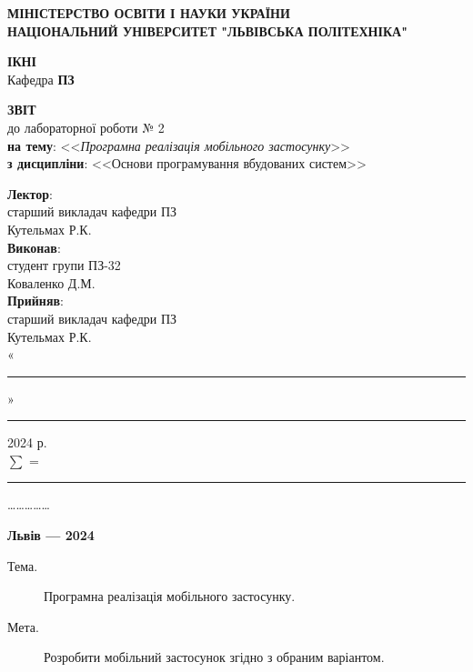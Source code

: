 \documentclass[oneside,14pt]{extarticle}
\newcommand\subject{Основи програмування вбудованих систем}
\newcommand\lecturer{старший викладач кафедри ПЗ\\Кутельмах Р.К.}
\newcommand\teacher{старший викладач кафедри ПЗ\\Кутельмах Р.К.}
\newcommand\mygroup{ПЗ-32}
\newcommand\lab{2}
\newcommand\theme{Програмна реалізація мобільного застосунку}
\newcommand\purpose{Розробити мобільний застосунок згідно з обраним варіантом}
\begin{document}
\begin{normalsize}
	\begin{titlepage}
		\thispagestyle{empty}
		\begin{center}
			\textbf{МІНІСТЕРСТВО ОСВІТИ І НАУКИ УКРАЇНИ\\
				НАЦІОНАЛЬНИЙ УНІВЕРСИТЕТ "ЛЬВІВСЬКА ПОЛІТЕХНІКА"}
		\end{center}
		\begin{flushright}
			\textbf{ІКНІ}\\
			Кафедра \textbf{ПЗ}
		\end{flushright}
		\vspace{80pt}
		\begin{center}
			\textbf{ЗВІТ}\\
			\vspace{10pt}
			до лабораторної роботи № \lab\\
			\textbf{на тему}: <<\textit{\theme}>>\\
			\textbf{з дисципліни}: <<\subject>>
		\end{center}
		\vspace{80pt}
		\begin{flushright}
			
			\textbf{Лектор}:\\
			\lecturer\\
			\vspace{28pt}
			\textbf{Виконав}:\\
			
			студент групи \mygroup\\
			Коваленко Д.М.\\
			\vspace{28pt}
			\textbf{Прийняв}:\\
			
			\teacher\\
			
			\vspace{28pt}
			«\rule{1cm}{0.15mm}» \rule{1.5cm}{0.15mm} 2024 р.\\
			$\sum$ = \rule{1cm}{0.15mm}……………\\
			
		\end{flushright}
		\vspace{\fill}
		\begin{center}
			\textbf{Львів — 2024}
		\end{center}
	\end{titlepage}
		
	\begin{description}
		\item[Тема.] \theme.
		\item[Мета.] \purpose.
	\end{description}



\end{normalsize}
\end{document}
